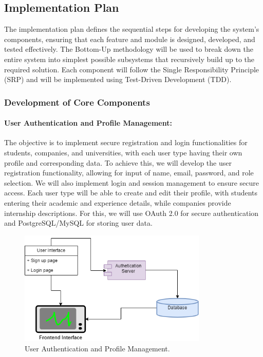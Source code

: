 \subsection{Implementation Plan}

The implementation plan defines the sequential steps for developing the system's components, ensuring that each feature and module is designed, developed, and tested effectively. The Bottom-Up methodology will be used to break down the entire system into simplest possible subsystems that recursively build up to the required solution. Each component will follow the Single Responsibility Principle (SRP) and will be implemented using Test-Driven Development (TDD).

\subsubsection{Development of Core Components}

\paragraph{User Authentication and Profile Management:}
The objective is to implement secure registration and login functionalities for students, companies, and universities, with each user type having their own profile and corresponding data. To achieve this, we will develop the user registration functionality, allowing for input of name, email, password, and role selection. We will also implement login and session management to ensure secure access. Each user type will be able to create and edit their profile, with students entering their academic and experience details, while companies provide internship descriptions. For this, we will use OAuth 2.0 for secure authentication and PostgreSQL/MySQL for storing user data.

\begin{figure}[H]
\centering
\includegraphics[width=0.8\textwidth]{Images/core1.png}
\caption{User Authentication and Profile Management.}
\end{figure}


